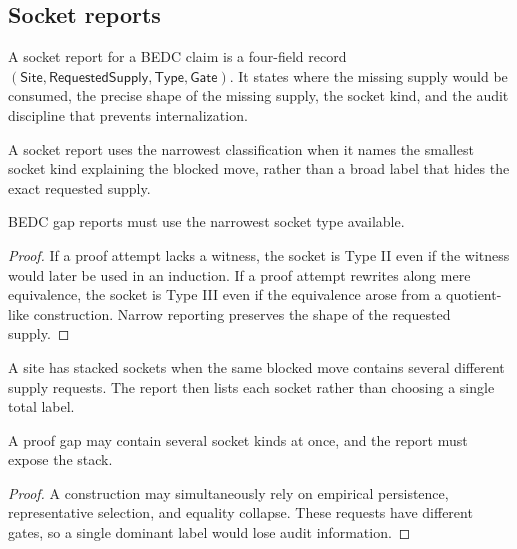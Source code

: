 \subsection{Socket reports}
\label{subsec:philosophy-socket-reports}

\begin{definition}
\label{def:philosophy-socket-report}
A socket report for a BEDC claim is a four-field record
\((\mathsf{Site},\mathsf{RequestedSupply},\mathsf{Type},\mathsf{Gate})\).
It states where the missing supply would be consumed, the precise
shape of the missing supply, the socket kind, and the audit discipline
that prevents internalization.
\end{definition}

\begin{definition}
\label{def:philosophy-narrowest-socket-classification}
A socket report uses the narrowest classification when it names the
smallest socket kind explaining the blocked move, rather than a broad
label that hides the exact requested supply.
\end{definition}

\begin{theorem}
\label{thm:philosophy-socket-reports-minimal}
BEDC gap reports must use the narrowest socket type available.
\end{theorem}
\begin{proof}
If a proof attempt lacks a witness, the socket is Type II even if the
witness would later be used in an induction. If a proof attempt rewrites
along mere equivalence, the socket is Type III even if the equivalence
arose from a quotient-like construction. Narrow reporting preserves the
shape of the requested supply.
\end{proof}

\begin{definition}
\label{def:philosophy-stacked-sockets}
A site has stacked sockets when the same blocked move contains several
different supply requests. The report then lists each socket rather
than choosing a single total label.
\end{definition}

\begin{theorem}
\label{thm:philosophy-complex-proofs-socket-stacks}
A proof gap may contain several socket kinds at once, and the report
must expose the stack.
\end{theorem}
\begin{proof}
A construction may simultaneously rely on empirical persistence,
representative selection, and equality collapse. These requests have
different gates, so a single dominant label would lose audit
information.
\end{proof}


